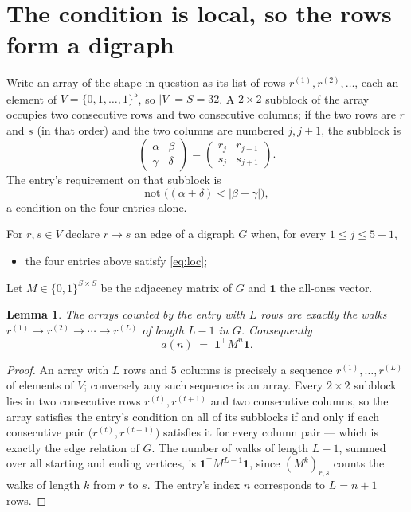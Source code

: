 \documentclass[11pt,a4paper]{article}
\theoremstyle{plain}
\newtheorem{lemma}[theorem]{Lemma}
\theoremstyle{definition}
\begin{document}
\section{The condition is local, so the rows form a digraph}

Write an array of the shape in question as its list of rows
$r^{(1)},r^{(2)},\dots$, each an element of
$V=\{0,1,\dots,1\}^{5}$, so $|V|=S=32$. A $2\times2$ subblock of the array
occupies two consecutive rows and two consecutive columns; if the two rows are $r$
and $s$ (in that order) and the two columns are numbered $j,j+1$,
the subblock is
\[
\begin{pmatrix}\alpha&\beta\\\gamma&\delta\end{pmatrix}=\begin{pmatrix}r_j&r_{j+1}\\s_j&s_{j+1}\end{pmatrix}.
\]
The entry's requirement on that subblock is
\begin{equation}\label{eq:loc}
\text{not }\bigl((\alpha+\delta)<|\beta-\gamma|\bigr),
\end{equation}
a condition on the four entries alone.

For $r,s\in V$ declare $r\to s$ an edge of a digraph $G$ when, for every
$1\le j\le 5-1$,
\begin{itemize}
\item the four entries above satisfy \eqref{eq:loc};

\end{itemize}
Let $M\in\{0,1\}^{S\times S}$ be the adjacency matrix of $G$ and $\mathbf{1}$ the
all-ones vector.

\begin{lemma}\label{lem:walk}
The arrays counted by the entry with $L$ rows are exactly the walks
$r^{(1)}\to r^{(2)}\to\cdots\to r^{(L)}$ of length $L-1$ in $G$. Consequently
\[
a(n)\;=\;\mathbf{1}^{\!\top}M^{n}\mathbf{1} .
\]
\end{lemma}

\begin{proof}
An array with $L$ rows and $5$ columns is precisely a sequence
$r^{(1)},\dots,r^{(L)}$ of elements of $V$; conversely any such sequence is an array.
Every $2\times2$ subblock lies in two consecutive rows $r^{(t)},r^{(t+1)}$ and two
consecutive columns, so the array satisfies the entry's condition on all of its subblocks
if and only if each consecutive pair $\bigl(r^{(t)},r^{(t+1)}\bigr)$ satisfies it for
every column pair --- which is exactly the edge relation of $G$. The number of walks of
length $L-1$, summed over all starting and ending vertices, is
$\mathbf{1}^{\!\top}M^{L-1}\mathbf{1}$, since $(M^{k})_{r,s}$ counts the walks of
length $k$ from $r$ to $s$. The entry's index $n$ corresponds to $L=n+1$ rows.
\end{proof}
\end{document}
